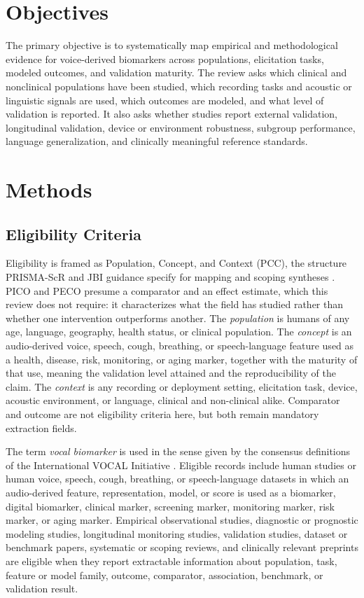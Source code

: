 \documentclass[11pt]{article}
\begin{document}
\section{Objectives}

The primary objective is to systematically map empirical and methodological evidence for voice-derived biomarkers across populations, elicitation tasks, modeled outcomes, and validation maturity. The review asks which clinical and nonclinical populations have been studied, which recording tasks and acoustic or linguistic signals are used, which outcomes are modeled, and what level of validation is reported. It also asks whether studies report external validation, longitudinal validation, device or environment robustness, subgroup performance, language generalization, and clinically meaningful reference standards.

\section{Methods}

\subsection{Eligibility Criteria}

Eligibility is framed as Population, Concept, and Context (PCC), the structure PRISMA-ScR and JBI guidance specify for mapping and scoping syntheses \citep{tricco2018prismascr,peters2020jbiscoping}. PICO and PECO presume a comparator and an effect estimate, which this review does not require: it characterizes what the field has studied rather than whether one intervention outperforms another. The \emph{population} is humans of any age, language, geography, health status, or clinical population. The \emph{concept} is an audio-derived voice, speech, cough, breathing, or speech-language feature used as a health, disease, risk, monitoring, or aging marker, together with the maturity of that use, meaning the validation level attained and the reproducibility of the claim. The \emph{context} is any recording or deployment setting, elicitation task, device, acoustic environment, or language, clinical and non-clinical alike. Comparator and outcome are not eligibility criteria here, but both remain mandatory extraction fields.

The term \emph{vocal biomarker} is used in the sense given by the consensus definitions of the International VOCAL Initiative \citep{pizzimenti2025vocal}. Eligible records include human studies or human voice, speech, cough, breathing, or speech-language datasets in which an audio-derived feature, representation, model, or score is used as a biomarker, digital biomarker, clinical marker, screening marker, monitoring marker, risk marker, or aging marker. Empirical observational studies, diagnostic or prognostic modeling studies, longitudinal monitoring studies, validation studies, dataset or benchmark papers, systematic or scoping reviews, and clinically relevant preprints are eligible when they report extractable information about population, task, feature or model family, outcome, comparator, association, benchmark, or validation result.
\end{document}
